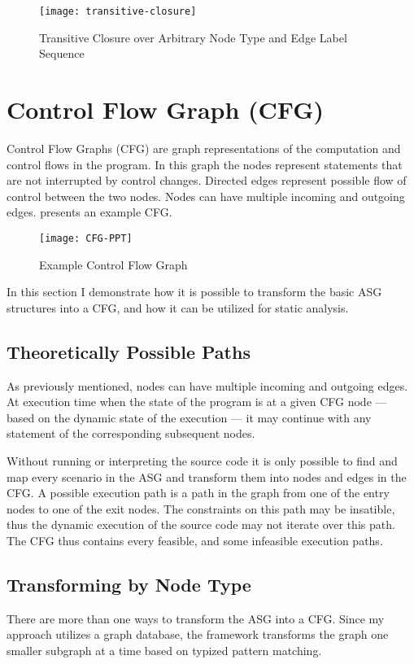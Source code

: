 \begin{figure}[htbp]
  \centering
  \texttt{[image: transitive-closure]}
  \caption{Transitive Closure over Arbitrary Node Type and Edge Label Sequence}
  \label{fig:transitive-closure}
\end{figure}


\section{Control Flow Graph (CFG)}
Control Flow Graphs (CFG) are graph representations of the computation and control flows in the program. In this graph the nodes represent statements that are not interrupted by control changes. Directed edges represent possible flow of control between the two nodes. Nodes can have multiple incoming and outgoing edges. %
 presents an example CFG.

\begin{figure}[htbp]
  \centering
  \texttt{[image: CFG-PPT]}
  \caption{Example Control Flow Graph}
  \label{fig:CFG-PPT}
\end{figure}

In this section I demonstrate how it is possible to transform the basic ASG structures into a CFG, and how it can be utilized for static analysis.

\subsection{Theoretically Possible Paths}
\label{sect:cfg-paths}
As previously mentioned, nodes can have multiple incoming and outgoing edges. At execution time when the state of the program is at a given CFG node --- based on the dynamic state of the execution --- it may continue with any statement of the corresponding subsequent nodes.

Without running or interpreting the source code it is only possible to find and map every scenario in the ASG and transform them into nodes and edges in the CFG. A possible execution path is a path in the graph from one of the entry nodes to one of the exit nodes. The constraints on this path may be insatible, thus the dynamic execution of the source code may not iterate over this path. The CFG thus contains every feasible, and some infeasible execution paths.

\subsection{Transforming by Node Type}
There are more than one ways to transform the ASG into a CFG. Since my approach utilizes a graph database, the framework transforms the graph one smaller subgraph at a time based on typized pattern matching.

